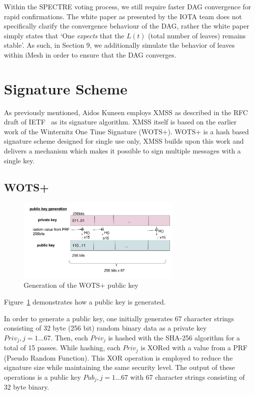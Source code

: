 \documentclass[a4paper,10pt,twocolumn]{article}
\begin{document}
Within the SPECTRE voting process, we still require faster DAG convergence for rapid confirmations. The white paper as presented by the 
IOTA team does not specifically clarify the convergence behaviour of the DAG, rather the white paper simply states that `One 
\emph{expects} that the \( L(t) \) (total number of leaves) remains stable'. As such, in Section 9, we additionally simulate the behavior of leaves within iMesh in order to ensure that the DAG converges.

\section{Signature Scheme}
\label{sec:sig}

As previously mentioned, Aidos Kuneen employs XMSS as described in the RFC draft of IETF~\cite{ietf} as its signature algorithm. XMSS 
itself is based on the earlier work of the Winternitz One Time Signature (WOTS+). WOTS+ is a hash based signature scheme designed for 
single use only, XMSS builds upon this work and delivers a mechanism which makes it possible to sign multiple messages with a single 
key.

\subsection{WOTS+}

\begin{figure}[ht]
	\begin{center}
	\includegraphics[width=80mm]{wots_pub.png}
	  \caption{Generation of the WOTS+ public key}
    \label{fig:wots_pub}
	\end{center}
 \end{figure}

 Figure~\ref{fig:wots_pub} demonstrates how a public key is generated.

 In order to generate a public key, one initially generates 67 character strings consisting of 32 byte (256 bit) random binary data as a 
 private key \( Priv_{j}, j=1 \ldots 67\). Then, each \( Priv_{j} \) is hashed with the SHA-256 algorithm for a total of 15 passes. 
 While hashing, each \( Priv_{j} \) is XORed with a value from a PRF (Pseudo Random Function). This XOR operation is employed to reduce 
 the signature size while maintaining the same security level. The output of these operations is a public 
 key \( Pub_{j}, j=1 \ldots 67\) with  67 character strings consisting  of 32 byte binary.
\end{document}
